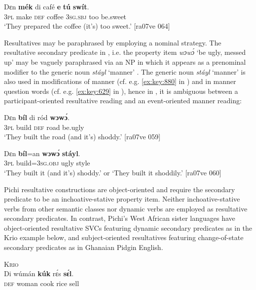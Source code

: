 \ea%
    \label{ex:key:1603}
    \gll Dɛn    \textbf{mék}    di  café    \textbf{e}    \textbf{tú}  \textbf{swít}.\\
\textsc{3pl}    make  \textsc{def}  coffee  \textsc{3sg.sbj}  too  be.sweet\\

\glt ‘They prepared the coffee (it’s) too sweet.’ [ra07ve 064]
\z

Resultatives may be paraphrased by employing a nominal strategy. The resultative secondary predicate in , i.e. the property item \textit{wɔwɔ́} ‘be ugly, messed up’ may be vaguely paraphrased via an NP in which it appears as a prenominal modifier to the generic noun \textit{stáyl} ‘manner’ . The generic noun \textit{stáyl} ‘manner’ is also used in modifications of manner (cf. e.g. \ref{ex:key:880} in ) and in manner question words (cf. e.g. \ref{ex:key:629} in ), hence in , it is ambiguous between a participant-oriented resultative reading and an event-oriented manner reading:


\ea%
    \label{ex:key:1604}
    \gll Dɛn  \textbf{bíl}   di  ród    \textbf{wɔwɔ́}.\\
\textsc{3pl}  build  \textsc{def}  road    be.ugly\\

\glt ‘They built the road (and it’s) shoddy.’ [ra07ve 059]
\z


\ea%
    \label{ex:key:1605}
    \gll Dɛn  \textbf{bíl}=an    \textbf{wɔwɔ́}  \textbf{stáyl}.\\
\textsc{3pl}  build=\textsc{3sg.obj}  ugly    style\\

\glt ‘They built it (and it’s) shoddy.’ or ‘They built it shoddily.’ [ra07ve 060]
\z

Pichi resultative constructions are object-oriented and require the secondary predicate to be an inchoative-stative property item. Neither inchoative-stative verbs from other semantic classes nor dynamic verbs are employed as resultative secondary predicates. In contrast, Pichi’s West African sister languages have object-oriented resultative SVCs featuring dynamic secondary predicates as in the Krio example below, and subject-oriented resultatives featuring change-of-state secondary predicates as in Ghanaian Pidgin English. 


\ea%
    \label{ex:key:1606}
\textsc{Krio}\\
    \gll Di  wúmán  \textbf{kúk}    rɛ́s    \textbf{sɛ́l}.\\
\textsc{def}  woman  cook  rice    sell\\

